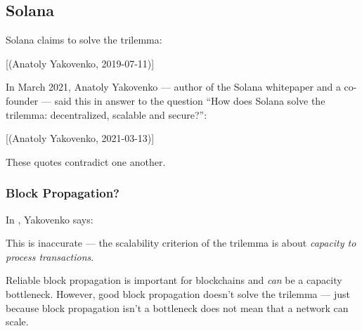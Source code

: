 \subsection{Solana}

Solana claims to solve the trilemma:

[\linkSolanaTurbineTrilemma (Anatoly Yakovenko, 2019-07-11)]

In March 2021, Anatoly Yakovenko --- author of the Solana whitepaper and a co-founder --- said this in answer to the question ``How does Solana solve the trilemma: decentralized, scalable and secure?'':

[\linkSolanaRedditTrilemma (Anatoly Yakovenko, 2021-03-13)]

These quotes contradict one another.

%
%

\subsubsection{Block Propagation?}

\label{sec:solana-block-propagation}

In \linkSolanaTurbineTrilemma, Yakovenko says:


This is inaccurate --- the scalability criterion of the trilemma is about \emph{capacity to process transactions}.

Reliable block propagation is important for blockchains and \emph{can} be a capacity bottleneck.
However, good block propagation doesn't solve the trilemma --- just because block propagation isn't a bottleneck does not mean that a network can scale.

